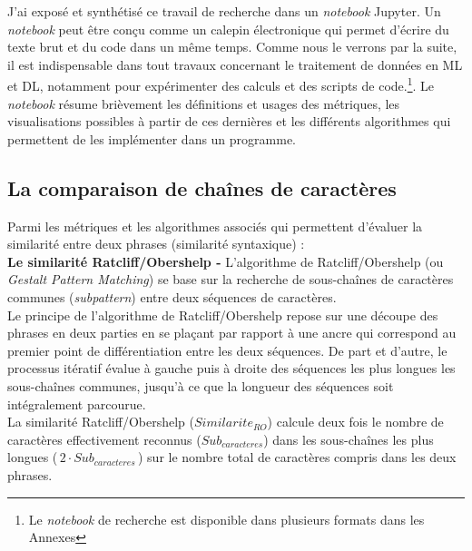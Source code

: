 J'ai exposé et synthétisé ce travail de recherche dans un \textit{notebook} Jupyter. Un \textit{notebook} peut être conçu comme un calepin électronique qui permet d'écrire du texte brut et du code dans un même temps. Comme nous le verrons par la suite, il est indispensable dans tout travaux concernant le traitement de données en ML et DL, notamment pour expérimenter des calculs et des scripts de code.\footnote{Le \textit{notebook} de recherche est disponible dans plusieurs formats dans les Annexes  }. Le \textit{notebook} résume brièvement les définitions et usages des métriques, les visualisations possibles à partir de ces dernières et les différents algorithmes qui permettent de les implémenter dans un programme.\\

\subsection{La comparaison de chaînes de caractères}

Parmi les métriques et les algorithmes associés qui permettent d'évaluer la similarité entre deux phrases (similarité syntaxique) :\\

\textbf{Le similarité Ratcliff/Obershelp -} L'algorithme de Ratcliff/Obershelp (ou \textit{Gestalt Pattern Matching}) se base sur la recherche de sous-chaînes de caractères communes (\textit{subpattern}) entre deux séquences de caractères.\\

Le principe de l'algorithme de Ratcliff/Obershelp repose sur une découpe des phrases en deux parties en se plaçant par rapport à une ancre qui correspond au premier point de différentiation entre les deux séquences. De part et d'autre, le processus itératif évalue à gauche puis à droite des séquences les plus longues les sous-chaînes communes, jusqu'à ce que la longueur des séquences soit intégralement parcourue.\\
\newpage
La similarité Ratcliff/Obershelp ($ Similarite_{RO} $) calcule deux fois le nombre de caractères effectivement reconnus ($Sub_{caracteres}$) dans les sous-chaînes les plus longues ($\, 2 \cdot Sub_{caracteres} \,$) sur le nombre total de caractères compris dans les deux phrases.\\

